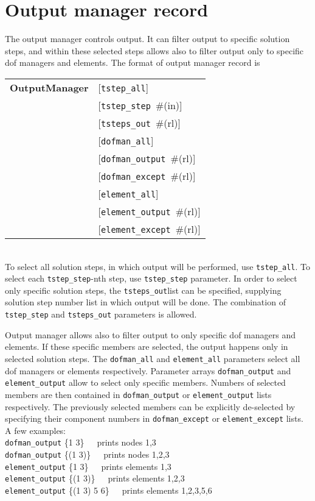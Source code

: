 \documentclass[a4paper]{report}
\newcommand{\param}[1]{\texttt{#1}} %
\newcommand{\optional}[1]{[#1]} %
\newcommand{\field}[2]{\param{#1}~\#{\tiny(#2)}} %
\newcommand{\optField}[2]{\optional{\field{#1}{#2}}}
\newcommand{\fieldnotype}[1]{\param{#1}}
\newcommand{\entKeywordInst}[1]{\textbf{#1}} %
\newenvironment{record}[1][]{\begin{tabular}{|ll}}{\end{tabular}\\}
\newcommand{\recentry}[2]{{#1}&{#2}\\}
\newcounter{rcc}
\newenvironment{record}[1][\textwidth]{\setcounter{rcc}{0}\rowcolors{1}{lightgray}{lightgray}\tabularx{#1}{llR} \hline}
               {\endtabularx}
\newcommand{\recentry}[2]{\ifthenelse{\value{rcc}>0}{$\backslash$ \\}{\setcounter{rcc}{1}}{#1}&{#2}&}
\begin{document}
\section{Output manager record}
\label{_OutputManagerRecord}
The output manager controls output. It can filter output to specific
solution steps, and within these selected steps allows also to filter
output only to specific dof managers and elements. The format of
output manager record is \\
\begin{record}
  \recentry{\entKeywordInst{OutputManager}}{[\fieldnotype{tstep\_all}]}
  \recentry{}{\optField{tstep\_step}{in}}
  \recentry{}{\optField{tsteps\_out}{rl}}
  \recentry{}{[\fieldnotype{dofman\_all}]}
  \recentry{}{\optField{dofman\_output}{rl}}
  \recentry{}{\optField{dofman\_except}{rl}}
  \recentry{}{[\fieldnotype{element\_all}]}
  \recentry{}{\optField{element\_output}{rl}}
  \recentry{}{\optField{element\_except}{rl}}
\end{record}
To select all solution steps, in which output will be performed, use
\param{tstep\_all}. To select each \param{tstep\_step}-nth step, use
\param{tstep\_step} parameter. In order to select only specific
solution steps, the \param{tsteps\_out}list can be specified,
supplying solution step number list in which output will be done.
The combination of \param{tstep\_step} and
\param{tsteps\_out} parameters is allowed.

Output manager allows also to filter output to only specific dof
managers and elements. If these specific members are selected, the
output happens only in selected solution steps.
The \param{dofman\_all} and \param{element\_all} parameters select
all dof managers or elements respectively. Parameter arrays
\param{dofman\_output} and \param{element\_output} allow to select
only specific members. Numbers of selected members are then contained
in \param{dofman\_output} or \param{element\_output} lists
respectively. The previously selected members can be explicitly
de-selected by specifying their component numbers in \param{dofman\_except} or
\param{element\_except} lists. A few examples:\\
\param{dofman\_output} \{1 3\}~~~prints nodes 1,3\\
\param{dofman\_output} \{(1 3)\}~~~prints nodes 1,2,3\\
\param{element\_output} \{1 3\}~~~prints elements 1,3\\
\param{element\_output} \{(1 3)\}~~~prints elements 1,2,3\\
\param{element\_output} \{(1 3) 5 6\}~~~prints elements 1,2,3,5,6\\
\end{document}
